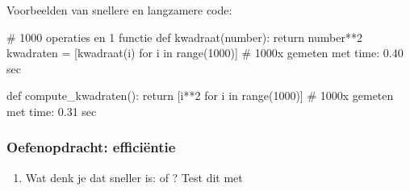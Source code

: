\documentclass[a4paper,11pt, fleqn]{article}
\begin{document}
Voorbeelden van snellere en langzamere code:

\begin{python}
	# 1000 operaties en 1 functie
	def kwadraat(number):
	return number**2
	kwadraten = [kwadraat(i) for i in range(1000)]
	# 1000x gemeten met time: 0.40 sec
	
	def compute_kwadraten():
	return [i**2 for i in range(1000)]
	# 1000x gemeten met time: 0.31 sec
\end{python}

\subsubsection*{Oefenopdracht: effici\"entie}
\begin{enumerate}[label=(\alph*)]
	\item Wat denk je dat sneller is:  of ? Test dit met 
\end{enumerate}
\end{document}
